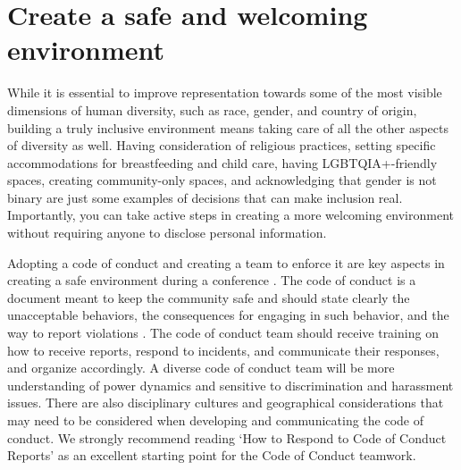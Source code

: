 \documentclass[10pt,letterpaper]{article}
\begin{document}



\section{Create a safe and welcoming environment}
\label{rule_inclusion}

While it is essential to improve representation towards some of the most visible dimensions of human diversity, such as race, gender, and country of origin, building a truly inclusive environment means taking care of all the other aspects of diversity as well. 
Having consideration of religious practices, setting specific accommodations for breastfeeding and child care, having LGBTQIA+-friendly spaces, creating community-only spaces, and acknowledging that gender is not binary are just some examples of decisions that can make inclusion real.
Importantly, you can take active steps in creating a more welcoming environment without requiring anyone to disclose personal information.

Adopting a code of conduct and creating a team to enforce it are key aspects in creating a safe environment during a conference \cite{favaroYourScienceConference2016}.
The code of conduct is a document meant to keep the community safe and should state clearly the unacceptable behaviors, the consequences for engaging in such behavior, and the way to report violations \cite{auroraHowRespondCode2019}. 
The code of conduct team should receive training on how to receive reports, respond to incidents, and communicate their responses, and organize accordingly. 
A diverse code of conduct team will be more understanding of power dynamics and sensitive to discrimination and harassment issues. 
There are also disciplinary cultures and geographical considerations that may need to be considered when developing and communicating the code of conduct. 
We strongly recommend reading `How to Respond to Code of Conduct Reports' \cite{auroraHowRespondCode2019} as an excellent starting point for the Code of Conduct teamwork.
\end{document}
